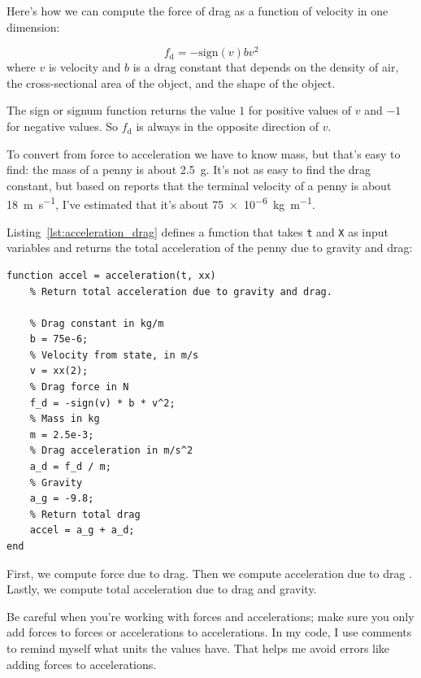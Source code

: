 
Here's how we can compute the force of drag as a function of velocity in one dimension:

\begin{equation*}
    f_\mathrm{d} = -\mathrm{sign}(v) b v^2
\end{equation*}
where $v$ is velocity and
$b$ is a drag constant that depends on the density of
air, the cross-sectional area of the object, and the shape
of the object.

The sign or signum function returns the value $1$ for positive values of
$v$ and $-1$ for negative values.  So $f_\mathrm{d}$ is always in the opposite direction of $v$.


To convert from force to acceleration we have to know mass, but that's easy to find: the mass of a penny is about \SI{2.5}{\gram}.  It's not as easy to find the drag constant, but based on reports that the terminal velocity of a penny is about \SI{18}{\meter \per \second}, I've estimated that it's about \SI{75e-6}{\kilogram \per \meter}.

Listing~\ref{lst:acceleration_drag} defines a function that takes \lstinline{t} and \lstinline{X} as input variables and returns the total acceleration of the penny due to gravity and drag:

\begin{lstlisting}[caption={Calculating acceleration of a penny with drag}, label={lst:acceleration_drag}]
function accel = acceleration(t, xx)
    % Return total acceleration due to gravity and drag.
    
    % Drag constant in kg/m
    b = 75e-6; 
    % Velocity from state, in m/s
    v = xx(2);
    % Drag force in N    
    f_d = -sign(v) * b * v^2;
    % Mass in kg
    m = 2.5e-3;
    % Drag acceleration in m/s^2
    a_d = f_d / m;
    % Gravity
    a_g = -9.8;
    % Return total drag
    accel = a_g + a_d;
end
\end{lstlisting}

First, we compute force due to drag. Then we compute acceleration due to drag .
Lastly, we compute total acceleration due to drag and gravity.


Be careful when you're working with forces and accelerations; make sure
you only add forces to forces or accelerations to accelerations.  In my
code, I use comments to remind myself what units the values have.
That helps me avoid errors like adding forces to accelerations.

